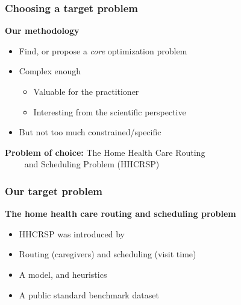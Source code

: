 \begin{frame}
   \frametitle{Choosing a target problem}

   \textbf{Our methodology}
   \begin{itemize}
      \item Find, or propose a \textit{core} optimization problem
      \item Complex enough
      \begin{itemize}
         \item Valuable for the practitioner
         \item Interesting from the scientific perspective
      \end{itemize}
      \item But not too much constrained/specific
   \end{itemize}

   \vspace*{18pt}
  \pause


   \textbf{Problem of choice: } The Home Health Care Routing \\
   \qquad \qquad \qquad \qquad ~~~~ and Scheduling Problem (HHCRSP)



\end{frame}

\begin{frame}
   \frametitle{Our target problem}

   \textbf{The home health care routing and scheduling problem}
   \begin{itemize}
      \item HHCRSP was introduced by \citet{mankowska2014}
      \item Routing (caregivers) and scheduling (visit time)
      \item A model, and heuristics
      \item A public standard benchmark dataset
   \end{itemize}



\end{frame}

